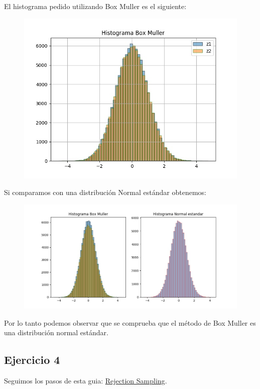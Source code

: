 \documentclass[11pt,a4paper]{article}
\begin{document}
		El histograma pedido utilizando Box Muller es el siguiente:
		\begin{figure}[H]
  			\centering
    			\includegraphics[width=14cm]{imagenes/histogramaEjer3}
		\end{figure}

		Si comparamos con una distribución Normal estándar obtenemos:
		\begin{figure}[H]
  			\centering
    			\includegraphics[width=20cm]{imagenes/histogramasEjer3}
		\end{figure}
		
		Por lo tanto podemos observar que se comprueba que el método de Box Muller es una distribución normal estándar.


	\subsection{Ejercicio 4}

	Seguimos los pasos de esta guia: \href{https://wiseodd.github.io/techblog/2015/10/21/rejection-sampling/}{ Rejection Sampling}.
\end{document}
